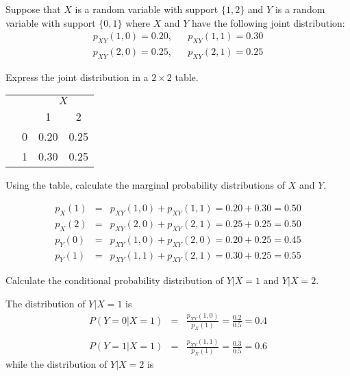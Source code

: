 \documentclass[addpoints,12pt]{exam}
\begin{document}
\begin{questions}
\question Suppose that $X$ is a random variable with support $\{1,2\}$ and $Y$ is a random variable with support $\{0,1\}$ where $X$ and $Y$ have the following joint distribution:
			\begin{eqnarray*}
				p_{XY}(1,0) = 0.20, && p_{XY}(1,1) = 0.30 \\
				p_{XY}(2,0) = 0.25, && p_{XY}(2,1) = 0.25
			\end{eqnarray*}
	\begin{parts}
		\item Express the joint distribution in a $2\times 2$ table.
			\begin{solution}
			\begin{center}
\begin{tabular}{|cc|cc|}
\hline
&&\multicolumn{2}{c|}{$X$}\\
&&1 & 2\\
\hline
&0& \multicolumn{1}{|c}{0.20} & 0.25\\
&1& \multicolumn{1}{|c}{0.30} & 0.25\\
\hline
\end{tabular}
\end{center}
			\end{solution}
		\item Using the table, calculate the marginal probability distributions of $X$ and $Y$.
			\begin{solution}
				\begin{eqnarray*}
					p_X(1) &=&p_{XY}(1,0) + p_{XY}(1,1)=0.20+0.30 = 0.50 \\
					p_X(2) &=&p_{XY}(2,0) + p_{XY}(2,1)=0.25 + 0.25 = 0.50 \\
					p_Y(0) &=&p_{XY}(1,0) + p_{XY}(2,0) = 0.20 + 0.25 = 0.45 \\
					p_Y(1) &=& p_{XY}(1,1) + p_{XY}(2,1) = 0.30 + 0.25 = 0.55
				\end{eqnarray*}
			\end{solution}
		\item Calculate the conditional probability distribution of $Y|X=1$ and $Y|X=2$.
			\begin{solution}
			The distribution of $Y|X = 1$ is
				\begin{eqnarray*}
					P(Y = 0|X = 1) &=&\frac{p_{XY}(1,0)}{p_X(1)} = \frac{0.2}{0.5}=0.4\\\\
					P(Y = 1|X= 1) &=&\frac{p_{XY}(1,1)}{p_X(1)} = \frac{0.3}{0.5} = 0.6
				\end{eqnarray*}
				while the distribution of $Y|X = 2$ is

\end{solution}
\end{parts}
\end{questions}
\end{document}
